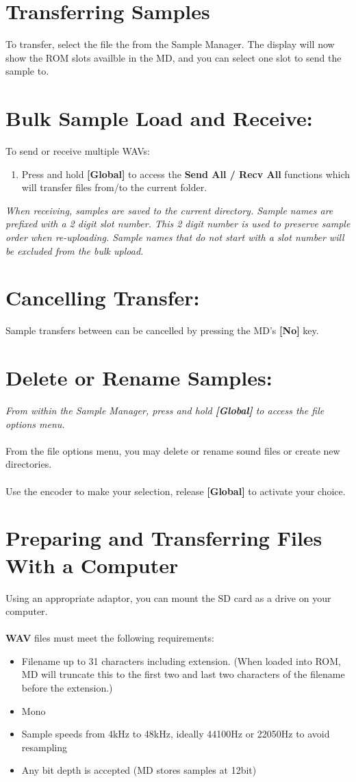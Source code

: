 \section{Transferring Samples}
To transfer, select the file the from the Sample Manager. The display will now show the ROM slots availble in the MD, and you can select one slot to send the sample to.
\section{Bulk Sample Load and Receive:}
To send or receive multiple WAVs:
\begin{enumerate}
\item Press and hold \textbf{[Global]} to access the \textbf{Send All / Recv All} functions which will transfer files from/to the current folder.
\end{enumerate}
\textit{When receiving, samples are saved to the current directory. Sample names are prefixed with a 2 digit slot number. This 2 digit number is used to preserve sample order when re-uploading. Sample names that do not start with a slot number will be excluded from the bulk upload.}
\section{Cancelling Transfer:}
Sample transfers between can be cancelled by pressing the MD's \textbf{[No]} key.
\newpage
\section{Delete or Rename Samples:}
\textit{From within the Sample Manager, press and hold \textbf{[Global]} to access the file options menu.}\\\\
From the file options menu, you may delete or rename sound files or create new directories.\\\\
Use the encoder to make your selection, release \textbf{[Global]} to activate your choice.
\section{Preparing and Transferring Files With a Computer}
Using an appropriate adaptor, you can mount the SD card as a drive on your computer. \\
\\
\textbf{WAV} files must meet the following requirements:
\begin{itemize}
    \item Filename up to 31 characters including extension. (When loaded into ROM, MD will truncate this to the first two and last two characters of the filename before the extension.)
    \item Mono
    \item Sample speeds from 4kHz to 48kHz, ideally 44100Hz or 22050Hz to avoid resampling
    \item Any bit depth is accepted (MD stores samples at 12bit)\newline
\end{itemize}